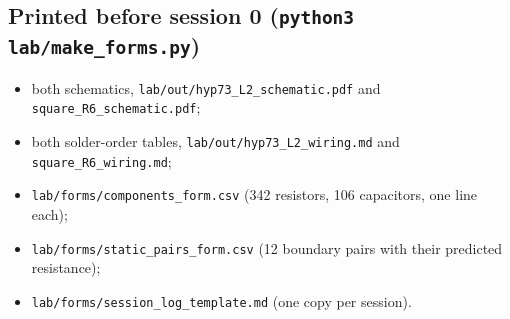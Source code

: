 \documentclass[11pt,a4paper]{article}
\begin{document}
\subsection*{Printed before session 0 (\texttt{python3 lab/make\_forms.py})}
\begin{itemize}
\item both schematics, \texttt{lab/out/hyp73\_L2\_schematic.pdf} and \texttt{square\_R6\_schematic.pdf};
\item both solder-order tables, \texttt{lab/out/hyp73\_L2\_wiring.md} and \texttt{square\_R6\_wiring.md};
\item \texttt{lab/forms/components\_form.csv} (342 resistors, 106 capacitors, one line each);
\item \texttt{lab/forms/static\_pairs\_form.csv} (12 boundary pairs with their predicted resistance);
\item \texttt{lab/forms/session\_log\_template.md} (one copy per session).
\end{itemize}
\end{document}
